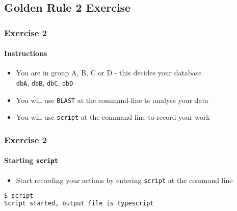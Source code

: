 %

\subsection{Golden Rule 2 Exercise}
\begin{frame}
  \frametitle{Exercise 2}
  \framesubtitle{Instructions}    
  \begin{itemize}
    \item You are in group A, B, C or D - this decides your database\\
    \texttt{dbA}, \texttt{dbB}, \texttt{dbC}, \texttt{dbD}
    \item You will use \texttt{BLAST} at the command-line to analyse your data
    \item You will use \texttt{script} at the command-line to record your work
  \end{itemize}
\end{frame}

\begin{frame}[fragile]
  \frametitle{Exercise 2}
  \framesubtitle{Starting \texttt{script}}    
  \begin{itemize}
    \item Start recording your actions by entering \texttt{script} at the command line      
  \end{itemize}
\begin{lstlisting}[language=bash]
$ script
Script started, output file is typescript
\end{lstlisting}    
\end{frame}


